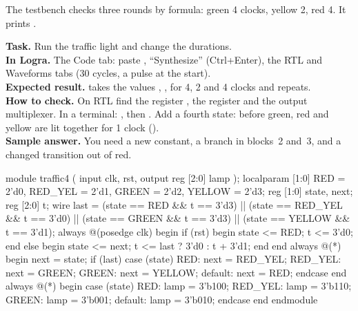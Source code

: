 
The testbench  checks three rounds by formula:
green 4 clocks, yellow 2, red 4. It prints .

\begin{diybox}
\textbf{Task.} Run the traffic light and change the durations.\\
\textbf{In Logra.} The Code tab: paste , ``Synthesize''
(Ctrl+Enter), the RTL and Waveforms tabs (30 cycles, a  pulse at the
start).\\
\textbf{Expected result.}  takes the values , ,
 for 4, 2 and 4 clocks and repeats.\\
\textbf{How to check.} On RTL find the register , the register
 and the output multiplexer. In a terminal:
, then .
 Add a fourth state: before green, red and yellow are lit together for
1 clock ().\\
\textbf{Sample answer.} You need a new constant, a branch in blocks~2 and~3, and
a changed transition out of red.
\end{diybox}

\begin{vcode}
module traffic4 (
    input            clk, rst,
    output reg [2:0] lamp
);
    localparam [1:0] RED = 2'd0, RED_YEL = 2'd1, GREEN = 2'd2, YELLOW = 2'd3;
    reg [1:0] state, next;
    reg [2:0] t;
    wire last = (state == RED && t == 3'd3) || (state == RED_YEL && t == 3'd0)
             || (state == GREEN && t == 3'd3) || (state == YELLOW && t == 3'd1);
    always @(posedge clk) begin
        if (rst) begin state <= RED; t <= 3'd0; end
        else begin state <= next; t <= last ? 3'd0 : t + 3'd1; end
    end
    always @(*) begin
        next = state;
        if (last) case (state)
            RED:     next = RED_YEL;
            RED_YEL: next = GREEN;
            GREEN:   next = YELLOW;
            default: next = RED;
        endcase
    end
    always @(*) begin
        case (state)
            RED:     lamp = 3'b100;
            RED_YEL: lamp = 3'b110;
            GREEN:   lamp = 3'b001;
            default: lamp = 3'b010;
        endcase
    end
endmodule
\end{vcode}


